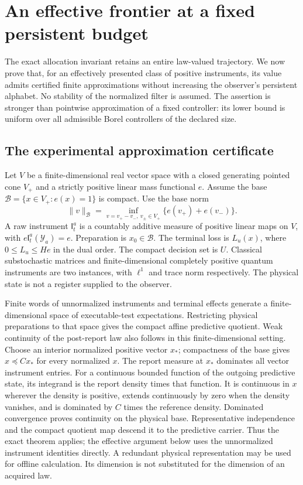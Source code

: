 \section{An effective frontier at a fixed persistent budget}\label{sec:effective}
The exact allocation invariant retains an entire law-valued trajectory. We now prove that, for an effectively presented class of positive instruments, its value admits certified finite approximations without increasing the observer's persistent alphabet. No stability of the normalized filter is assumed. The assertion is stronger than pointwise approximation of a fixed controller: its lower bound is uniform over all admissible Borel controllers of the declared size.

\subsection{The experimental approximation certificate}
Let $V$ be a finite-dimensional real vector space with a closed generating pointed cone $V_+$ and a strictly positive linear mass functional $e$. Assume the base $\mathcal B=\{x\in V_+:e(x)=1\}$ is compact. Use the base norm
\[
 \|v\|_{\mathcal B}=\inf_{v=v_+-v_-,\ v_\pm\in V_+}
                      \{e(v_+)+e(v_-)\}.
\]
A raw instrument $\mathsf I_t^a$ is a countably additive measure of positive linear maps on $V$, with $e\mathsf I_t^a(\mathcal Y_a)=e$. Preparation is $x_0\in\mathcal B$. The terminal loss is $L_u(x)$, where $0\le L_u\le He$ in the dual order. The compact decision set is $U$. Classical substochastic matrices and finite-dimensional completely positive quantum instruments are two instances, with $\ell^1$ and trace norm respectively. The physical state is not a register supplied to the observer.

Finite words of unnormalized instruments and terminal effects generate a finite-dimensional space of executable-test expectations. Restricting physical preparations to that space gives the compact affine predictive quotient. Weak continuity of the post-report law also follows in this finite-dimensional setting. Choose an interior normalized positive vector $x_*$; compactness of the base gives $x\preceq Cx_*$ for every normalized $x$. The report measure at $x_*$ dominates all vector instrument entries. For a continuous bounded function of the outgoing predictive state, its integrand is the report density times that function. It is continuous in $x$ wherever the density is positive, extends continuously by zero when the density vanishes, and is dominated by $C$ times the reference density. Dominated convergence proves continuity on the physical base. Representative independence and the compact quotient map descend it to the predictive carrier. Thus the exact theorem applies; the effective argument below uses the unnormalized instrument identities directly. A redundant physical representation may be used for offline calculation. Its dimension is not substituted for the dimension of an acquired law.

